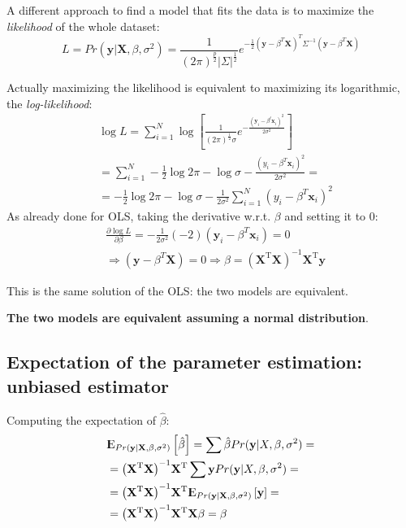 \documentclass[12pt, letterpaper]{article}
\theoremstyle{definition}
\newcommand{\E}{{\rm I\kern-.3em E}}
\newcommand{\X}{\mathrm{\mathbf{X}}}
\newcommand{\y}{\mathbf{y}}
\newcommand{\hbe}{\hat{\mathbf{\beta}}}
\newcommand{\x}{\mathbf{x}}
\newcommand{\inv}{\mathrm{\left( \X^T\X\right)^{-1}}}
\newcommand{\HM}{\mathrm{\inv\X^T}}
\begin{document}
A different approach to find a model that fits the data is to maximize the \textit{likelihood} of the whole dataset:
\begin{equation}
L = Pr(\y|\X, \beta, \sigma^2)  = \frac{1}{(2\pi)^{\frac{p}{2}}|\Sigma|^\frac{1}{2}}e^{-\frac{1}{2}\left(\y-\beta^T\X\right)^T\Sigma^{-1}\left(\y-\beta^T\X\right)}
\end{equation}

Actually maximizing the likelihood is equivalent to maximizing its logarithmic, the \textit{log-likelihood}:
\begin{equation}
\begin{aligned}
&\log L = \sum_{i=1}^N \log\left[\frac{1}{(2\pi)^{\frac{1}{2}}\sigma}e^{-\frac{\left(\y_i-\beta^t \x_i\right)^2} {2\sigma^2}}\right]\\
&=\sum_{i=1}^N -\frac{1}{2}\log2\pi -\log \sigma -\frac{\left(y_i-\beta^T\x_i\right)^2} {2\sigma^2} =\\
&= -\frac{1}{2}\log2\pi -\log \sigma -\frac{1}{2\sigma^2} \sum_{i=1}^N\left(y_i-\beta^T\x_i\right)^2
\end{aligned}
\end{equation}
As already done for OLS, taking the derivative w.r.t. $\beta$ and setting it to $0$:
\begin{equation}
\begin{aligned}
&\frac{\partial \log L}{\partial \beta} = -\frac{1}{2\sigma^2} \left(-2\right) \left(\y_i-\beta^T\x_i\right) = 0 \\
&\Rightarrow \left(\y-\beta^T\X \right)= 0 \Rightarrow \beta = \HM \y
\end{aligned}
\end{equation}

This is the same solution of the OLS: the two models are equivalent.

\textbf{The two models are equivalent assuming a normal distribution}.

\subsection{Expectation of the parameter estimation: unbiased estimator}
Computing the expectation of $\hat{\beta}$:
\begin{equation}
\begin{aligned}
&\E_{Pr(\y|\X,\beta, \sigma^2)}\left[ \hbe\right]= \sum \hbe Pr(\y|X, \beta, \sigma^2) =\\
&= \HM \sum \y Pr(\y |X, \beta, \sigma^2)  = \\
&=\HM \E_{Pr(\y | \X,\beta, \sigma^2)} \left[ \y\right] = \\
&= \HM \X \beta = \beta
\end{aligned}
\end{equation}
\end{document}
